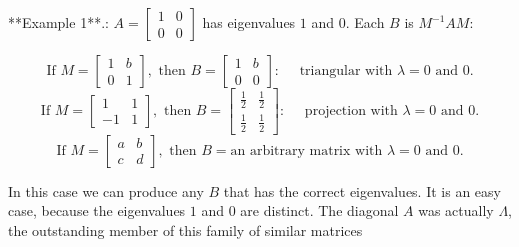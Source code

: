 

**Example 1**.: \(A=\left[\begin{smallmatrix}1&0\\ 0&0\end{smallmatrix}\right]\) has eigenvalues \(1\) and \(0\). Each \(B\) is \(M^{-1}AM\):

\[\text{If }M =\left[\begin{matrix}1&b\\ 0&1\end{matrix}\right],\text{ then }B=\left[\begin{matrix}1&b\\ 0&0\end{matrix}\right]:\quad\text{ triangular with }\lambda=0\text{ and }0.\] \[\text{If }M =\left[\begin{matrix}1&1\\ -1&1\end{matrix}\right],\text{ then }B=\left[\begin{matrix}\frac{1}{2}&\frac{1}{2}\\ \frac{1}{2}&\frac{1}{2}\end{matrix}\right]:\quad\text{ projection with }\lambda=0\text{ and }0.\] \[\text{If }M =\left[\begin{matrix}a&b\\ c&d\end{matrix}\right],\text{ then }B=\text{an arbitrary matrix with }\lambda=0\text{ and }0.\]

In this case we can produce any \(B\) that has the correct eigenvalues. It is an easy case, because the eigenvalues \(1\) and \(0\) are distinct. The diagonal \(A\) was actually \(\Lambda\), the outstanding member of this family of similar matrices
